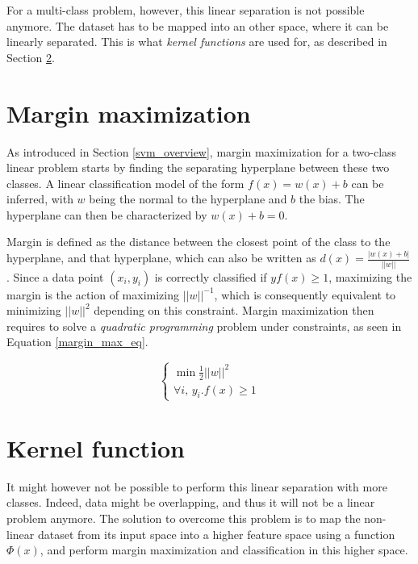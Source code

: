 \noindent For a multi-class problem, however, this linear separation is not possible anymore. The dataset has to be mapped into an other space, where it can be linearly separated. This is what \textit{kernel functions} are used for, as described in Section \ref{kernel_fct}.
\newline

\section{Margin maximization}
\label{margin_max}

\vspace{\baselineskip}
\noindent As introduced in Section \ref{svm_overview}, margin maximization for a two-class linear problem starts by finding the separating hyperplane between these two classes. A linear classification model of the form $f(x) = w(x) + b$ can be inferred, with $w$ being the normal to the hyperplane and $b$ the bias. The hyperplane can then be characterized by  $w(x) + b = 0$.
\newline

\noindent Margin is defined as the distance between the closest point of the class to the hyperplane, and that hyperplane, which can also be written as $ d(x) = \frac{|w(x) + b |}{||w||}$. Since a data point $(x_i, y_i)$ is correctly classified if $yf(x) \geq 1$, maximizing the margin is the action of maximizing $||w||^{-1}$, which is consequently equivalent to minimizing $||w||^2$ depending on this constraint. Margin maximization then requires to solve a \textit{quadratic programming} problem under constraints, as seen in Equation \ref{margin_max_eq}.

\begin{equation}
\left\{
\begin{array}{l}
\min \frac{1}{2} ||w||^2 \\
\forall i, \, y_i . f(x) \geq 1
\end{array}
\right.
\label{margin_max_eq}
\end{equation}

\vspace{\baselineskip}

\section{Kernel function}
\label{kernel_fct}

\vspace{\baselineskip}
\noindent It might however not be possible to perform this linear separation with more classes. Indeed, data might be overlapping, and thus it will not be a linear problem anymore. The solution to overcome this problem is to map the non-linear dataset from its input space into a higher feature space using a function $\Phi(x)$, and perform margin maximization and classification in this higher space. 
\newline

